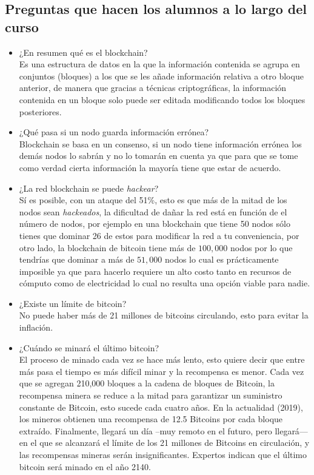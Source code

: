 \documentclass[a4paper,12pt]{lib/pub}
\begin{document}
\subsection{Preguntas que hacen los alumnos a lo largo del curso}
\begin{itemize}
	\item ¿En resumen qué es el blockchain?\\
	Es una estructura de datos en la que la información contenida se agrupa en conjuntos (bloques) a los que se les añade información relativa a otro bloque anterior, de manera que gracias a técnicas criptográficas, la información contenida en un bloque solo puede ser editada modificando todos los bloques posteriores.
	\item ¿Qué pasa si un nodo guarda información errónea?\\
	Blockchain se basa en un consenso, si un nodo tiene información errónea los demás nodos lo sabrán y no lo tomarán en cuenta ya que para que se tome como verdad cierta información la mayoría tiene que estar de acuerdo.
	\item ¿La red blockchain se puede \textit{hackear}?\\
	Sí es posible, con un ataque del 51\%, esto es que más de la mitad de los nodos sean \textit{hackeados}, la dificultad de dañar la red está en función de el número de nodos, por ejemplo en una blockchain que tiene 50 nodos sólo tienes que dominar 26 de estos para modificar la red a tu conveniencia, por otro lado, la blockchain de bitcoin tiene más de $ 100,000 $ nodos por lo que tendrías que dominar a más de $ 51,000 $ nodos lo cual es prácticamente imposible ya que para hacerlo requiere un alto costo tanto en recursos de cómputo como de electricidad lo cual no resulta una opción viable para nadie.
	\item ¿Existe un límite de bitcoin?\\
	No puede haber más de 21 millones de bitcoins circulando, esto para evitar la inflación.
	\item ¿Cuándo se minará el último bitcoin?\\
	El proceso de minado cada vez se hace más lento, esto quiere decir que entre más pasa el tiempo es más difícil minar y la recompensa es menor. Cada vez que se agregan 210,000 bloques a la cadena de bloques de Bitcoin, la recompensa minera se reduce a la mitad para garantizar un suministro constante de Bitcoin, esto sucede cada cuatro años. En la actualidad (2019), los mineros obtienen una recompensa de 12.5 Bitcoins por cada bloque extraído. Finalmente, llegará un día –muy remoto en el futuro, pero llegará— en el que se alcanzará el límite de los 21 millones de Bitcoins en circulación, y las recompensas mineras serán insignificantes. Expertos indican que el último bitcoin será minado en el año 2140.

\end{itemize}
\end{document}
